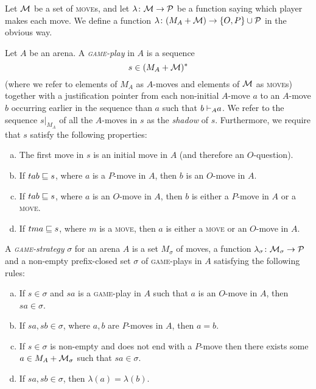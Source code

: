 \documentclass{article}
\newcommand{\game}{\textsc{game}}
\newcommand{\move}{\textsc{move}}
\begin{document}
\begin{definition}
  Let $\mathcal M$ be a set of \move{}s, and let $\lambda\colon\mathcal M\to\mathcal P$ be a function saying which player makes each move.  We define a function $\lambda\colon (M_A+\mathcal M)\to\{O,P\}\cup \mathcal P$ in the obvious way.  

  Let $A$ be an arena.  
  A \emph{\game{}-play} in $A$ is a sequence
  \[
    s \in (M_A + \mathcal M)^*
    \]
  (where we refer to elements of $M_A$ as $A$-moves and elements of $\mathcal M$ as \move{}s) together with a justification pointer from each non-initial $A$-move $a$ to an $A$-move $b$ occurring earlier in the sequence than $a$ such that $b{\;\vdash}_A a$.  
  We refer to the sequence $s\vert_{M_A}$ of all the $A$-moves in $s$ as the \emph{shadow} of $s$.
  Furthermore, we require that $s$ satisfy the following properties:
  \begin{enumerate}[a)]
    \item The first move in $s$ is an initial move in $A$ (and therefore an $O$-question).
    \item If $tab\sqsubseteq s$, where $a$ is a $P$-move in $A$, then $b$ is an $O$-move in $A$.
    \item If $tab\sqsubseteq s$, where $a$ is an $O$-move in $A$, then $b$ is either a $P$-move in $A$ or a \move{}.
    \item If $tma\sqsubseteq s$, where $m$ is a \move{}, then $a$ is either a \move{} or an $O$-move in $A$.
  \end{enumerate}
\end{definition}

\begin{definition}
  A \emph{\game{}-strategy} $\sigma$ for an arena $A$ is a set $M_\sigma$ of moves, a function $\lambda_\sigma\colon \mathcal M_\sigma\to\mathcal P$ and a non-empty prefix-closed set $\sigma$ of \game{}-plays in $A$ satisfying the following rules:
  \begin{enumerate}[a)]
    \item If $s\in\sigma$ and $sa$ is a \game{}-play in $A$ such that $a$ is an $O$-move in $A$, then $sa\in\sigma$.
    \item If $sa,sb\in\sigma$, where $a,b$ are $P$-moves in $A$, then $a=b$.
    \item If $s\in\sigma$ is non-empty and does not end with a $P$-move then there exists some $a\in M_A+\mathcal M_\sigma$ such that $sa\in\sigma$.
    \item If $sa,sb\in\sigma$, then $\lambda(a)=\lambda(b)$.
  \end{enumerate}
\end{definition}
\end{document}

